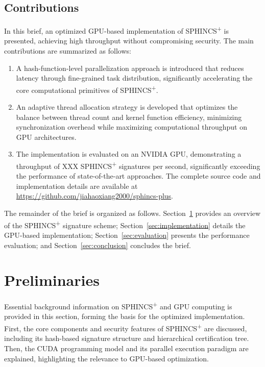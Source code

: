 \documentclass[journal]{IEEEtran}
\begin{document}
\subsection{Contributions}

In this brief, an optimized GPU-based implementation of SPHINCS\textsuperscript{+} is presented, achieving high throughput without compromising security. The main contributions are summarized as follows:

\begin{enumerate}
  \item A hash-function-level parallelization approach is introduced that reduces latency through fine-grained task distribution, significantly accelerating the core computational primitives of SPHINCS\textsuperscript{+}.

  \item An adaptive thread allocation strategy is developed that optimizes the balance between thread count and kernel function efficiency, minimizing synchronization overhead while maximizing computational throughput on GPU architectures.
  \item The implementation is evaluated on an NVIDIA GPU, demonstrating a throughput of XXX SPHINCS\textsuperscript{+} signatures per second, significantly exceeding the performance of state-of-the-art approaches. The complete source code and implementation details are available at \url{https://github.com/jiahaoxiang2000/sphincs-plus}.
\end{enumerate}

The remainder of the brief is organized as follows. Section~\ref{sec:preliminaries} provides an overview of the SPHINCS\textsuperscript{+} signature scheme; Section~\ref{sec:implementation} details the GPU-based implementation; Section~\ref{sec:evaluation} presents the performance evaluation; and Section~\ref{sec:conclusion} concludes the brief.

\section{Preliminaries}\label{sec:preliminaries}


Essential background information on SPHINCS\textsuperscript{+} and GPU computing is provided in this section, forming the basis for the optimized implementation. First, the core components and security features of SPHINCS\textsuperscript{+} are discussed, including its hash-based signature structure and hierarchical certification tree. Then, the CUDA programming model and its parallel execution paradigm are explained, highlighting the relevance to GPU-based optimization.
\end{document}
